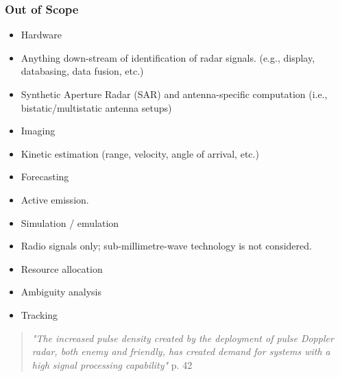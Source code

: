 \subsubsection{Out of Scope}

\begin{itemize}
    \item Hardware
    \item Anything down-stream of identification of radar signals. (e.g., display, databasing, data fusion, etc.)
    \item Synthetic Aperture Radar (SAR) and antenna-specific computation (i.e., bistatic/multistatic antenna setups)
    \item Imaging
    \item Kinetic estimation (range, velocity, angle of arrival, etc.)
    \item Forecasting
    \item Active emission.
    \item Simulation / emulation
    \item Radio signals only; sub-millimetre-wave technology is not considered.
    \item Resource allocation
    \item Ambiguity analysis
    \item Tracking
\end{itemize}



\begin{quote}
    \textit{"The increased pulse density created by the deployment of pulse Doppler radar, both enemy and friendly, has created demand for systems with a high signal processing capability"} \cite{pettersson_illustrated_1992} p. 42
\end{quote}


